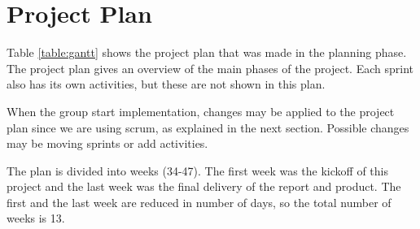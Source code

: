 \section{Project Plan}

	Table \ref{table:gantt} shows the project plan that was made in the planning phase. The project plan
	gives an overview of the main phases of the project. Each sprint also has its own activities, but
	these are not shown in this plan. 

	When the group start implementation, changes may be applied to the project plan since we
	are using scrum, as explained in the next section. Possible changes may be moving sprints or add activities. 

	The plan is divided into weeks (34-47). The first week was the kickoff of this project
	and the last week was the final delivery of the report and product.
	The first and the last week are reduced in number of days, so the total number of weeks is 13. \\

